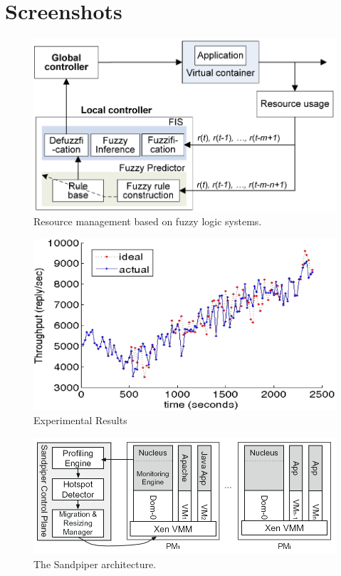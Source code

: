 \documentclass[12pt]{article} %
\begin{document}
\section{Screenshots}
\begin{figure}[h!]
  \centering
   \includegraphics[scale=0.50]{fuzzy_block_dia.png}
  \caption{Resource management based on fuzzy logic systems.}
\end{figure}

\begin{figure}[h!]
  \centering
   \includegraphics[scale=0.50]{fuzzy_experiment.png}
  \caption{Experimental Results}
\end{figure}
\begin{figure}[h!]
  \centering
   \includegraphics[scale=0.60]{sandpiper_arch.png}
  \caption{The Sandpiper architecture.}
\end{figure}
\end{document}
